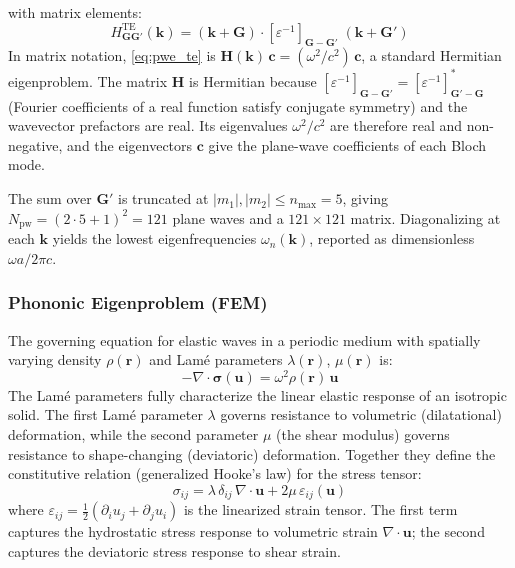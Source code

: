 \documentclass[11pt]{article}
\begin{document}
with matrix elements:
\begin{equation}
    H^{\text{TE}}_{\mathbf{G}\mathbf{G}'}(\mathbf{k}) = (\mathbf{k}+\mathbf{G}) \cdot [\varepsilon^{-1}]_{\mathbf{G}-\mathbf{G}'} \; (\mathbf{k}+\mathbf{G}')
    \label{eq:H_te}
\end{equation}
In matrix notation, \cref{eq:pwe_te} is $\mathbf{H}(\mathbf{k})\,\mathbf{c} = (\omega^2/c^2)\,\mathbf{c}$, a standard Hermitian eigenproblem. The matrix $\mathbf{H}$ is Hermitian because $[\varepsilon^{-1}]_{\mathbf{G}-\mathbf{G}'} = [\varepsilon^{-1}]^*_{\mathbf{G}'-\mathbf{G}}$ (Fourier coefficients of a real function satisfy conjugate symmetry) and the wavevector prefactors are real. Its eigenvalues $\omega^2/c^2$ are therefore real and non-negative, and the eigenvectors $\mathbf{c}$ give the plane-wave coefficients of each Bloch mode.

The sum over $\mathbf{G}'$ is truncated at $|m_1|, |m_2| \leq n_\text{max} = 5$, giving $N_\text{pw} = (2 \cdot 5 + 1)^2 = 121$ plane waves and a $121 \times 121$ matrix. Diagonalizing at each $\mathbf{k}$ yields the lowest eigenfrequencies $\omega_n(\mathbf{k})$, reported as dimensionless $\omega a / 2\pi c$.

\subsubsection{Phononic Eigenproblem (FEM)}

The governing equation for elastic waves in a periodic medium with spatially varying density $\rho(\mathbf{r})$ and Lam\'e parameters $\lambda(\mathbf{r})$, $\mu(\mathbf{r})$ is:
\begin{equation}
    -\nabla \cdot \boldsymbol{\sigma}(\mathbf{u}) = \omega^2 \rho(\mathbf{r})\,\mathbf{u}
    \label{eq:elastic_gov}
\end{equation}
The Lam\'e parameters fully characterize the linear elastic response of an isotropic solid. The first Lam\'e parameter $\lambda$ governs resistance to volumetric (dilatational) deformation, while the second parameter $\mu$ (the shear modulus) governs resistance to shape-changing (deviatoric) deformation. Together they define the constitutive relation (generalized Hooke's law) for the stress tensor:
\begin{equation}
    \sigma_{ij} = \lambda\, \delta_{ij}\, \nabla \cdot \mathbf{u} + 2\mu\, \varepsilon_{ij}(\mathbf{u})
    \label{eq:hooke}
\end{equation}
where $\varepsilon_{ij} = \tfrac{1}{2}(\partial_i u_j + \partial_j u_i)$ is the linearized strain tensor. The first term captures the hydrostatic stress response to volumetric strain $\nabla \cdot \mathbf{u}$; the second captures the deviatoric stress response to shear strain.
\end{document}
